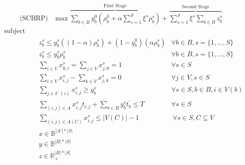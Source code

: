 \begin{align}
	\text{(SCBRP)} & \max \overbrace{\sum_{b \in B} y_{b}^{0}(\rho_{b}^{0} + \alpha \sum_{s = 1}^{S} \xi^s \rho_{b}^{s})}^{\text{First Stage}} + \overbrace{\sum_{s = 1}^{S} \xi^s \sum_{b \in B} z_{b}^{s}}^{\text{Second Stage}} & \label{eq:sof}
\end{align}
\begin{align}
	\nonumber \text{subject to:} &                                                                                           &                                                                            \\
	                             & z_{b}^{s} \leq y_{b}^{s}((1 - \alpha)\rho_{b}^{s}) + (1 - y_{b}^{0})(\alpha \rho_{b}^{s}) & \forall b \in B, s = \{1, \dots, S\} \label{eq:z-value}                    \\
	                             & z_{b}^{s} \leq y_{b}^{s}\rho_{b}^{s}                                                      & \forall b \in B, s = \{1, \dots, S\} \label{eq:z-y-value}                  \\
	                             & \sum_{i \in V} x_{0,i}^{s} = \sum_{j \in V} x_{j,0}^{s} = 1                               & \forall s \in S \label{eq:stochastic-s-t-all}                              \\
	                             & \sum_{i \in V} x_{i,j}^{s} - \sum_{k \in V} x_{j,k}^{s} = 0                               & \forall j \in V, s \in S \label{eq:stochastic-flow-conservation}           \\
	                             & \sum_{j \in \delta^{-}(i)} x_{i,j}^{s} \geq y_{b}^{s}                                     & \forall s \in S, b \in B, i \in V(b) \label{eq:stochastic-in-path}         \\
	                             & \sum_{(i, j) \in A} x_{i,j}^{s}t_{i,j} + \sum_{b \in B} y_{b}^{s}t^{'}_{b} \leq T         & \forall s \in S \label{eq:stochastic-max-time}                             \\
	                             & \sum_{(i, j) \in A(C)} x_{i,j}^{s} \leq |V(C)| - 1                                        & \ \forall s \in S, C \subseteq V \label{eq:stochastic-subtour-elimination} \\
	                             & x \in \mathbb{B}^{|A'| * |S|}                                                             & \label{eq:stochastic-dom-x}                                                \\
	                             & y \in \mathbb{B}^{|B| * |S|}                                                              & \label{eq:stochastic-dom-y}                                                \\
	                             & z \in \mathbb{R}_{+}^{|B| * |S|}                                                          & \label{eq:stochastic-dom-z}
\end{align}


